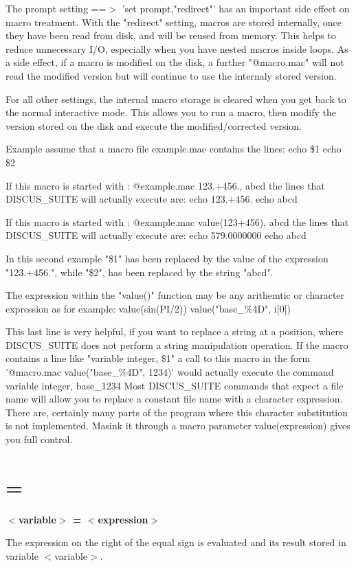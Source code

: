\par
The prompt setting ==$> $ 'set prompt,"redirect"' has an important side 
effect on macro treatment. 
With the "redirect" setting, macros are stored internally, 
once they have been read from disk, and will be reused from memory. This 
helps to reduce unnecessary I/O, especially when you have nested macros 
inside loops. As a side effect, if a macro is modified on the disk, 
a further "@macro.mac" will not read the modified version but will 
continue to use the internaly stored version. 
\par
For all other settings, the internal macro storage is 
cleared when you get back to the normal interactive mode. This allows 
you to run a macro, then modify the version stored on the disk and 
execute the modified/corrected version. 
\par
Example 
assume that a macro file example.mac contains the lines: 
echo \$1 
echo \$2 
\par
If this macro is started with : 
@example.mac 123.+456., abcd 
the lines that DISCUS\_SUITE will actually execute are: 
echo 123.+456. 
echo abcd 
\par
If this macro is started with : 
@example.mac value(123+456), abcd 
the lines that DISCUS\_SUITE will actually execute are: 
echo  579.0000000 
echo abcd 
\par
In this second example "\$1" has been replaced by the value 
of the expression "123.+456.", while "\$2", has been replaced 
by the string "abcd". 
\par
The expression within the "value()" function may be any 
arithemtic or character expression as for example: 
value(sin(PI/2)) 
value("base\_\%4D", i[0]) 
\par
This last line is very helpful, if you want to replace a 
string at a position, where DISCUS\_SUITE does not perform 
a string manipulation operation. If the macro contains a 
line like "variable integer, \$1" a call to this macro 
in the form '@macro.mac value("base\_\%4D", 1234)' 
would actually execute the command 
variable integer, base\_1234 
Most DISCUS\_SUITE commands that expect a file name will 
allow you to replace a constant file name with a 
character expression. There are, certainly many parts 
of the program where this character substitution is not 
implemented. Masink it through a macro parameter 
value(expression) gives you full control. 
\section{=}
{\bf $ <$variable$> $ = $ <$expression$> $ \par }
\par
\vspace{3pt}
The expression on the right of the equal sign is evaluated and its result 
stored in variable $ <$variable$> $. 
